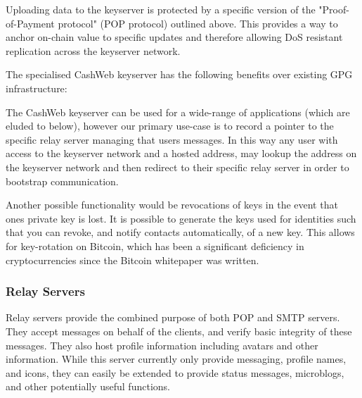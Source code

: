 \documentclass{article}
\begin{document}
Uploading data to the keyserver is protected by a specific version of the "Proof-of-Payment protocol" (POP protocol) outlined above. This provides a way to anchor on-chain value to specific updates and therefore allowing DoS resistant replication across the keyserver network.

The specialised CashWeb keyserver has the following benefits over existing GPG infrastructure:

The CashWeb keyserver can be used for a wide-range of applications (which are eluded to below), however our primary use-case is to record a pointer to the specific relay server managing that users messages. In this way any user with access to the keyserver network and a hosted address, may lookup the address on the keyserver network and then redirect to their specific relay server in order to bootstrap communication. 

Another possible functionality would be revocations of keys in the event that ones private key is lost. It is possible to generate the keys used for identities such that you can revoke, and notify contacts automatically, of a new key. This allows for key-rotation on Bitcoin, which has been a significant deficiency in cryptocurrencies since the Bitcoin whitepaper was written.

\subsubsection{Relay Servers}

Relay servers provide the combined purpose of both POP and SMTP servers. They accept messages on behalf of the clients, and verify basic integrity of these messages. They also host profile information including avatars and other information. While this server currently only provide messaging, profile names, and icons, they can easily be extended to provide status messages, microblogs, and other potentially useful functions.
\end{document}
